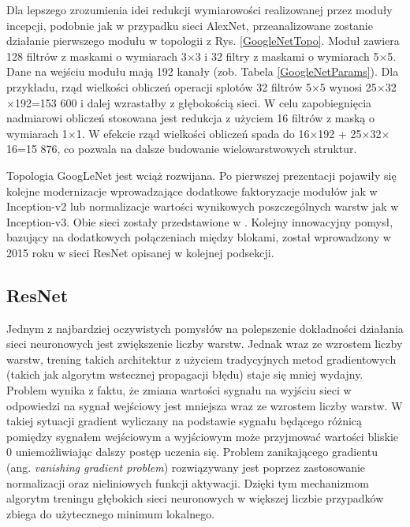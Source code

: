 Dla lepszego zrozumienia idei redukcji wymiarowości realizowanej przez moduły incepcji, podobnie jak w przypadku sieci AlexNet, przeanalizowane zostanie działanie pierwszego modułu w topologii z Rys. \ref{GoogleNetTopo}.
Moduł zawiera 128 filtrów z maskami o wymiarach 3$\times$3 i 32 filtry z maskami o wymiarach 5$\times$5. Dane na wejściu modułu mają 192 kanały (zob. Tabela \ref{GoogleNetParams}). Dla przykładu, rząd wielkości obliczeń operacji splotów 32 filtrów 5$\times$5 wynosi 25$\times$32$\times$192=153 600 i dalej wzrastałby z głębokością sieci. W celu zapobiegnięcia nadmiarowi obliczeń stosowana jest redukcja z użyciem 16 filtrów z maską o wymiarach 1$\times$1. W efekcie rząd wielkości obliczeń spada do 16$\times$192 +  25$\times$32$\times$16=15 876, co pozwala na dalsze budowanie wielowarstwowych struktur.

Topologia GoogLeNet jest wciąż rozwijana. Po pierwszej prezentacji pojawiły się kolejne modernizacje wprowadzające dodatkowe faktoryzacje modułów jak w Inception-v2 lub normalizacje wartości wynikowych poszczególnych warstw jak w Inception-v3. Obie sieci zostały przedstawione w \cite{DBLP:journals/corr/SzegedyVISW15}. Kolejny innowacyjny pomysł, bazujący na dodatkowych połączeniach między blokami, został wprowadzony w 2015 roku w sieci ResNet opisanej w kolejnej podsekcji.

\subsection{ResNet}
\label{resnet}
Jednym z najbardziej oczywistych pomysłów na polepszenie dokładności działania sieci neuronowych jest zwiększenie liczby warstw. Jednak wraz ze wzrostem liczby warstw, trening takich architektur z użyciem tradycyjnych metod gradientowych (takich jak algorytm wstecznej propagacji błędu) staje się mniej wydajny. Problem wynika z faktu, że zmiana wartości sygnału na wyjściu sieci w odpowiedzi na sygnał wejściowy jest mniejsza wraz ze wzrostem liczby warstw. W takiej sytuacji gradient wyliczany na podstawie sygnału będącego różnicą pomiędzy sygnałem wejściowym a wyjściowym może przyjmować wartości bliskie 0 uniemożliwiając dalszy postęp uczenia się. Problem zanikającego gradientu (ang. \textit{vanishing gradient problem}) rozwiązywany jest poprzez zastosowanie normalizacji oraz nieliniowych funkcji aktywacji. Dzięki tym mechanizmom algorytm treningu głębokich sieci neuronowych w większej liczbie przypadków zbiega do użytecznego minimum lokalnego. 

